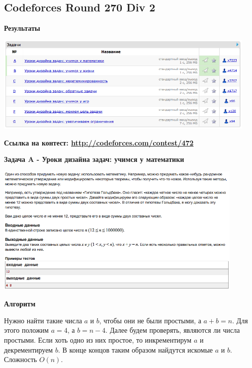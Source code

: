 \documentclass[a4paper,12pt]{article}
\begin{document}
%
%

\newpage
\subsection{Codeforces Round 270 Div 2}

\textbf{{\large Результаты}} \\
\begin{center}
\includegraphics[width=0.95\textwidth]{C_270/C_270_result.png}\\ [1cm]
\end{center}

\textbf{{\large Ссылка на контест: \url{http://codeforces.com/contest/472}}}

\newpage
\textbf{{\large Задача A - Уроки дизайна задач: учимся у математики}}

\begin{center}
\includegraphics[width=0.9\textwidth]{C_270/C_270_A.png}\\ [1cm]
\end{center}

\textbf{{\large Алгоритм}}

Нужно найти такие числа $a$ и $b$, чтобы они не были простыми, а $a + b = n$. Для этого положим $a = 4$, а $b = n - 4$. Далее будем проверять, являются ли числа простыми. Если хоть одно из них простое, то инкрементирум $a$ и декрементируем $b$. В конце концов таким образом найдутся искомые $a$ и $b$. Сложность $O(n)$.\\
\end{document}
